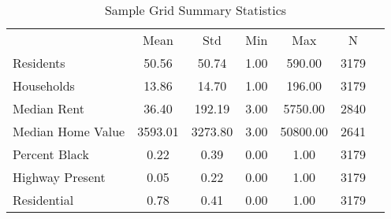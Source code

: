 \begin{table}[h]
\centering
\caption{Sample Grid Summary Statistics}
\label{tab:summary_stats}
\begin{tabular}{lcccccc}
 & Mean & Std & Min & Max & N \\
Residents & 50.56 & 50.74 & 1.00 & 590.00 & 3179 \\
Households & 13.86 & 14.70 & 1.00 & 196.00 & 3179 \\
Median Rent & 36.40 & 192.19 & 3.00 & 5750.00 & 2840 \\
Median Home Value & 3593.01 & 3273.80 & 3.00 & 50800.00 & 2641 \\
Percent Black & 0.22 & 0.39 & 0.00 & 1.00 & 3179 \\
Highway Present & 0.05 & 0.22 & 0.00 & 1.00 & 3179 \\
Residential & 0.78 & 0.41 & 0.00 & 1.00 & 3179 \\
\end{tabular}
\end{table}
